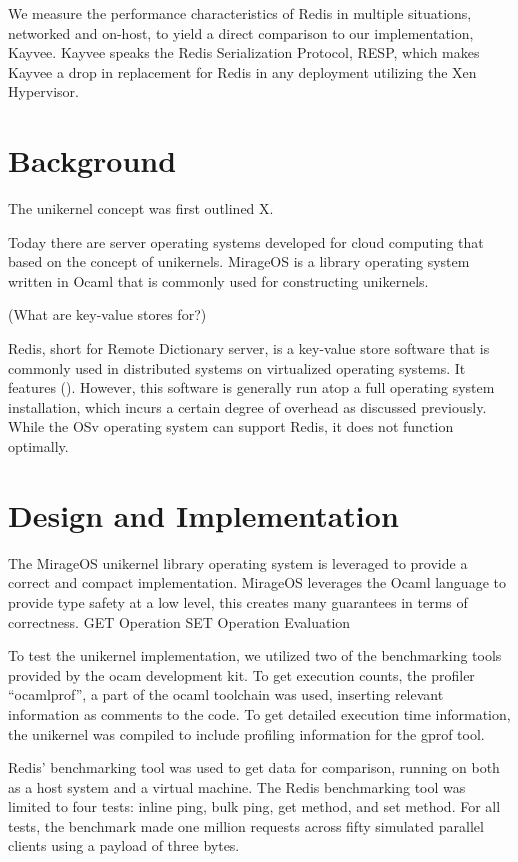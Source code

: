 \documentclass[english,10pt,twocolumn]{article}
\begin{document}
We measure the performance characteristics of Redis in multiple situations, networked and on-host, to yield a direct comparison to our implementation, Kayvee.
Kayvee speaks the Redis Serialization Protocol\cite{redis-protocol}, RESP, which makes Kayvee a drop in replacement for Redis in any deployment utilizing the Xen Hypervisor.


\section{Background}
The unikernel concept was first outlined X.

Today there are server operating systems developed for cloud computing that based on the concept of unikernels. MirageOS is a library operating system written in Ocaml that is commonly used for constructing unikernels.

(What are key-value stores for?) 

Redis, short for Remote Dictionary server, is a key-value store software that is commonly used in distributed systems on virtualized operating systems. It features (). However, this software is generally run atop a full operating system installation, which incurs a certain degree of overhead as discussed previously.  While the OSv operating system can support Redis, it does not function optimally.

\section{Design and Implementation}

The MirageOS unikernel library operating system is leveraged to provide a correct and compact implementation. MirageOS leverages the Ocaml language to provide type safety at a low level, this creates many guarantees in terms of correctness.
GET Operation
SET Operation
Evaluation

To test the unikernel implementation, we utilized two of the benchmarking tools provided by the  ocam development kit. To get execution counts, the profiler “ocamlprof”, a part of the ocaml toolchain was used, inserting relevant information as comments to the code. To get detailed execution time information, the unikernel was compiled to include profiling information for the gprof tool.

Redis’ benchmarking tool was used to get data for comparison, running on both as a host system and a virtual machine. The Redis benchmarking tool was limited to four tests: inline ping, bulk ping, get method, and set method. For all tests, the benchmark made one million requests across fifty simulated parallel clients using a payload of three bytes.
\end{document}
